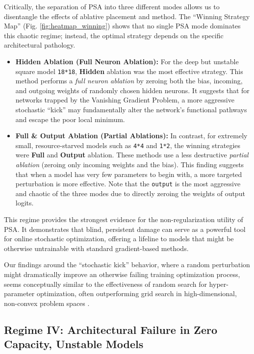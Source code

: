 \documentclass[conference]{IEEEtran}
\begin{document}
Critically, the separation of PSA into three different modes allows us to disentangle the effects of ablative placement and method. The ``Winning Strategy Map'' (Fig. \ref{fig:heatmap_winning}) shows that no single PSA mode dominates this chaotic regime; instead, the optimal strategy depends on the specific architectural pathology.

\begin{itemize}
    \item \textbf{Hidden Ablation (Full Neuron Ablation):} For the deep but unstable square model \texttt{18*18}, \textbf{Hidden} ablation was the most effective strategy. This method performs a \textit{full neuron ablation} by zeroing both the bias, incoming, and outgoing weights of randomly chosen hidden neurons. It suggests that for networks trapped by the Vanishing Gradient Problem, a more aggressive stochastic ``kick'' may fundamentally alter the network's functional pathways and escape the poor local minimum.

    \item \textbf{Full \& Output Ablation (Partial Ablations):} In contrast, for extremely small, resource-starved models such as \texttt{4*4} and \texttt{1*2}, the winning strategies were \textbf{Full} and \textbf{Output} ablation. These methods use a less destructive \textit{partial ablation} (zeroing only incoming weights and the bias). This finding suggests that when a model has very few parameters to begin with, a more targeted perturbation is more effective. Note that the \verb|output| is the most aggressive and chaotic of the three modes due to directly zeroing the weights of output logits.
\end{itemize}

This regime provides the strongest evidence for the non-regularization utility of PSA. It demonstrates that blind, persistent damage can serve as a powerful tool for online stochastic optimization, offering a lifeline to models that might be otherwise untrainable with standard gradient-based methods.

Our findings around the ``stochastic kick'' behavior, where a random perturbation might dramatically improve an otherwise failing training optimization process, seems conceptually similar to the effectiveness of random search for hyper-parameter optimization, often outperforming grid search in high-dimensional, non-convex problem spaces \cite{b7}.

\subsection{Regime IV: Architectural Failure in Zero Capacity, Unstable Models}
\end{document}
